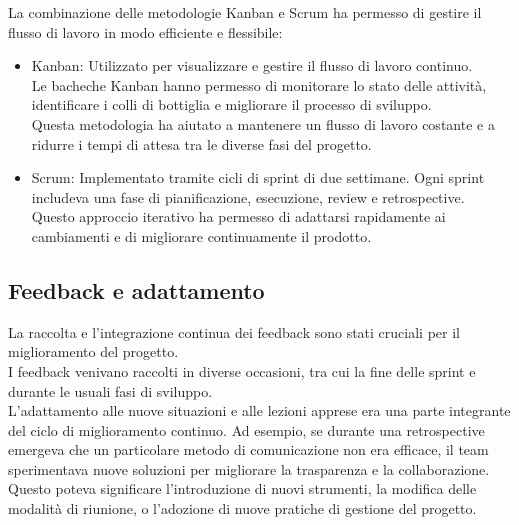 La combinazione delle metodologie Kanban e Scrum ha permesso di gestire il flusso
di lavoro in modo efficiente e flessibile:
\begin{itemize}
  \item Kanban: Utilizzato per visualizzare e gestire il flusso di lavoro
    continuo.\\ Le bacheche Kanban hanno permesso di monitorare lo stato delle
    attività, identificare i colli di bottiglia e migliorare il processo di sviluppo.\\
    Questa metodologia ha aiutato a mantenere un flusso di lavoro costante e a ridurre
    i tempi di attesa tra le diverse fasi del progetto.

  \item Scrum: Implementato tramite cicli di sprint di due settimane. Ogni sprint
    includeva una fase di pianificazione, esecuzione, review e retrospective.\\ Questo
    approccio iterativo ha permesso di adattarsi rapidamente ai cambiamenti e di
    migliorare continuamente il prodotto.
\end{itemize}

\subsection{Feedback e adattamento}
\label{sub:feedback}

La raccolta e l'integrazione continua dei feedback sono stati cruciali per il
miglioramento del progetto.\\ I feedback venivano raccolti in diverse occasioni,
tra cui la fine delle sprint e durante le usuali fasi di sviluppo.\\ L'adattamento
alle nuove situazioni e alle lezioni apprese era una parte integrante del ciclo di
miglioramento continuo. Ad esempio, se durante una retrospective emergeva che un
particolare metodo di comunicazione non era efficace, il team sperimentava nuove
soluzioni per migliorare la trasparenza e la collaborazione.\\ Questo poteva
significare l'introduzione di nuovi strumenti, la modifica delle modalità di riunione,
o l'adozione di nuove pratiche di gestione del progetto.